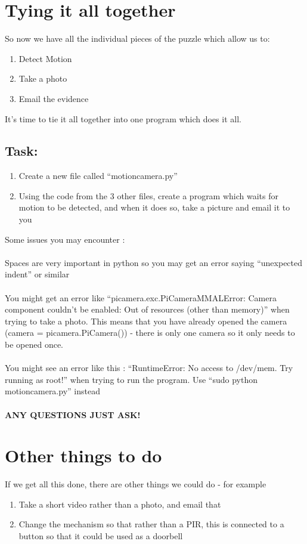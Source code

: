 \documentclass[a4paper]{article}
\begin{document}
\newpage\section {Tying it all together}
So now we have all the individual pieces of the puzzle which allow us to:
\begin{enumerate}
\item Detect Motion
\item Take a photo
\item Email the evidence
\end{enumerate}

It's time to tie it all together into one program which does it all. 
\subsection{Task:}
\begin{enumerate}
\item Create a new file called ``motioncamera.py''
\item Using the code from the 3 other files, create a program which waits for motion to be detected, and when it does so, take a picture and email it to you
\end{enumerate}    
Some issues you may encounter : \\ 
\\
Spaces are very important in python so you may get an error saying ``unexpected indent'' or similar\\ 
\\
You might get an error like ``picamera.exc.PiCameraMMALError: Camera component couldn't be enabled: Out of resources (other than memory)'' when trying to take a photo. 
This means that you have already opened the camera (camera = picamera.PiCamera()) - there is only one camera so it only needs to be opened once. \\
\\
You might see an error like this : ``RuntimeError: No access to /dev/mem.  Try running as root!'' when trying to run the program. Use ``sudo python motioncamera.py'' instead \\
\\
\textbf{ANY QUESTIONS JUST ASK!}


\newpage\section{Other things to do}
If we get all this done, there are other things we could do - for example
\begin{enumerate}
\item Take a short video rather than a photo, and email that
\item Change the mechanism so that rather than a PIR, this is connected to a button so that it could be used as a doorbell
\end{enumerate}
\end{document}
